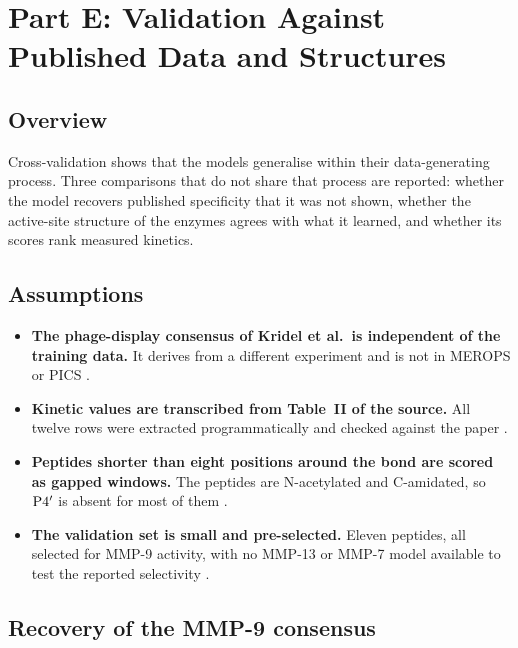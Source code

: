 \section{Part E: Validation Against Published Data and Structures}
\label{sec:valid}

\subsection{Overview}

Cross-validation shows that the models generalise within their data-generating
process. Three comparisons that do not share that process are reported: whether
the model recovers published specificity that it was not shown, whether the
active-site structure of the enzymes agrees with what it learned, and whether
its scores rank measured kinetics.

\subsection{Assumptions}

\begin{assump}
\begin{itemize}[leftmargin=*,noitemsep]
\item \textbf{The phage-display consensus of Kridel et al.\ is independent of
  the training data.} It derives from a different experiment and is not in
  MEROPS or PICS  \FLAG.
\item \textbf{Kinetic values are transcribed from Table~II of the source.} All
  twelve rows were extracted programmatically and checked against the paper
   \CONF.
\item \textbf{Peptides shorter than eight positions around the bond are scored
  as gapped windows.} The peptides are N-acetylated and C-amidated, so
  $\mathrm{P}4'$ is absent for most of them \CONF.
\item \textbf{The validation set is small and pre-selected.} Eleven peptides,
  all selected for MMP-9 activity, with no MMP-13 or MMP-7 model available to
  test the reported selectivity \CONF.
\end{itemize}
\end{assump}

\subsection{Recovery of the MMP-9 consensus}

